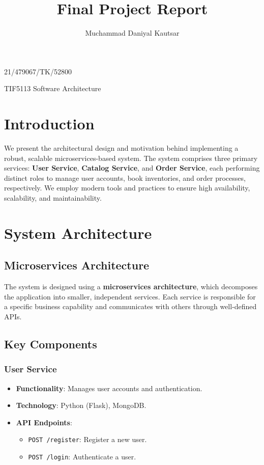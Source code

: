 \documentclass{article}
\title{Final Project Report}
\author{Muchammad Daniyal Kautsar}
\date{}
\begin{document}
\maketitle
\vspace{-3em}
\begin{center}
    21/479067/TK/52800
\end{center}
\vspace{-1.5em}
\begin{center}
    TIF5113 Software Architecture
\end{center}

\section{Introduction}

We present the architectural design and motivation behind implementing a robust, scalable microservices-based system. The system comprises three primary services: \textbf{User Service}, \textbf{Catalog Service}, and \textbf{Order Service}, each performing distinct roles to manage user accounts, book inventories, and order processes, respectively. We employ modern tools and practices to ensure high availability, scalability, and maintainability.

\section{System Architecture}

\subsection{Microservices Architecture}

The system is designed using a \textbf{microservices architecture}, which decomposes the application into smaller, independent services. Each service is responsible for a specific business capability and communicates with others through well-defined APIs.

\subsection{Key Components}

\subsubsection{User Service}
\begin{itemize}
    \item \textbf{Functionality}: Manages user accounts and authentication.
    \item \textbf{Technology}: Python (Flask), MongoDB.
    \item \textbf{API Endpoints}:
    \begin{itemize}
        \item \texttt{POST /register}: Register a new user.
        \item \texttt{POST /login}: Authenticate a user.
    \end{itemize}
\end{itemize}
\end{document}
